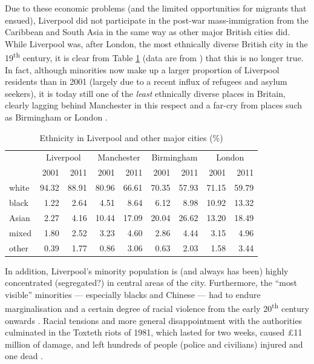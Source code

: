 Due to these economic problems (and the limited opportunities for migrants that ensued), Liverpool did not participate in the post-war mass-immigration from the Caribbean and South Asia in the same way as other major British cities did.
While Liverpool was, after London, the most ethnically diverse British city in the 19\textsuperscript{th} century, it is clear from Table \ref{tab.ethnicity} (data are from \citealt{nomis}) that this is no longer true.
In fact, although minorities now make up a larger proportion of Liverpool residents than in 2001 (largely due to a recent influx of refugees and asylum seekers), it is today still one of the \emph{least} ethnically diverse places in Britain, clearly lagging behind Manchester in this respect and a far-cry from places such as Birmingham or London \citep[cf.][187]{pooley2006}.

	\begin{table}[h]
		\centering
		\caption{Ethnicity in Liverpool and other major cities (\%)}
		\begin{tabular}{lrrrrrrrr}
			\hline
	 		& \multicolumn{2}{c}{Liverpool} & \multicolumn{2}{c}{Manchester} & \multicolumn{2}{c}{Birmingham} & \multicolumn{2}{c}{London} \\
			 & 2001 & 2011 & 2001 & 2011 & 2001 & 2011 & 2001 & 2011 \\
			 \hline
			 white & 94.32 & 88.91 & 80.96 & 66.61 & 70.35 & 57.93 & 71.15 & 59.79 \\
			 black & 1.22 & 2.64 & 4.51 & 8.64 & 6.12 & 8.98 & 10.92 & 13.32 \\
	 		 Asian & 2.27 & 4.16 & 10.44 & 17.09 & 20.04 & 26.62 & 13.20 & 18.49 \\
	 		 mixed & 1.80 & 2.52 & 3.23 & 4.60 & 2.86 & 4.44 & 3.15 & 4.96 \\
	 		 other & 0.39 & 1.77 & 0.86 & 3.06 & 0.63 & 2.03 & 1.58 & 3.44 \\
	 		 \hline
		\end{tabular}
		\label{tab.ethnicity}
	\end{table}

In addition, Liverpool's minority population is (and always has been) highly concentrated (segregated?) in central areas of the city.
Furthermore, the ``most visible'' minorities --- especially blacks and Chinese --- had to endure marginalisation and a certain degree of racial violence from the early 20\textsuperscript{th} century onwards \citep[cf.][189--191]{pooley2006}.
Racial tensions and more general disappointment with the authorities culminated in the Toxteth riots of 1981, which lasted for two weeks, caused \pounds11 million of damage, and left hundreds of people (police and civilians) injured and one dead \citep[cf][440--444]{murden2006}.

